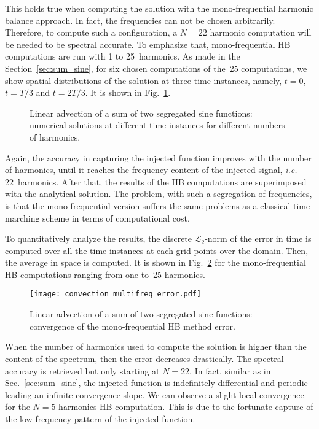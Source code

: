 This holds true when computing the solution with the mono-frequential
harmonic balance approach. In fact, the frequencies can not be chosen arbitrarily.
Therefore, to compute such a configuration, a $N=22$ harmonic computation
will be needed to be spectral accurate. To emphasize that, mono-frequential
HB computations are run with 1 to 25~harmonics.
As made in the Section~\ref{sec:sum_sine}, 
for six chosen computations of the~25 computations, 
we show spatial distributions of the solution
at three time instances, namely, $t=0$, $t=T/3$ and $t=2T/3$.
It is shown in Fig.~\ref{fig:inj_multifreq_tsm}.
\begin{figure}[htp]
  \centering
  \caption{Linear advection of a sum of two segregated sine functions: 
  numerical solutions at different time instances for different numbers of harmonics.}
  \label{fig:inj_multifreq_tsm}
\end{figure}
Again, the accuracy in capturing the injected function
improves with the number of harmonics,
until it reaches the frequency content
of the injected signal, \emph{i.e.} 22~harmonics.
After that, the results of the HB computations are
superimposed with the analytical solution. 
The problem, with such a segregation of frequencies, is that 
the mono-frequential version suffers the same
problems as a classical time-marching scheme in terms of 
computational cost.

To quantitatively analyze the results,
the discrete $\mathcal{L}_2$-norm of the error 
in time is computed over all the time instances
at each grid points over the domain.
Then, the average in space is computed.
It is shown in Fig.~\ref{fig:conv_multifreq_tsm} for the
mono-frequential HB computations ranging from one to~25
harmonics.
\begin{figure}[htp]
  \centering
  \texttt{[image: convection\_multifreq\_error.pdf]}
  \caption{Linear advection of a sum of two segregated sine functions: convergence of the mono-frequential HB method error.}
  \label{fig:conv_multifreq_tsm}
\end{figure}
When the number of harmonics
used to compute the solution is higher than the content of the spectrum,
then the error decreases drastically. The spectral accuracy is retrieved
but only starting at $N=22$.
In fact, similar as in Sec.~\ref{sec:sum_sine},
the injected function is indefinitely differential and periodic
leading an infinite convergence slope. We can observe a slight local convergence
for the $N=5$ harmonics HB computation. This is due to the fortunate 
capture of the low-frequency pattern of the injected function.

